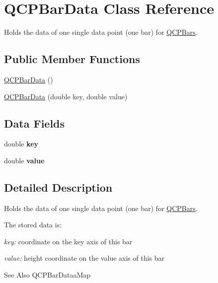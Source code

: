 \hypertarget{classQCPBarData}{\section{Q\-C\-P\-Bar\-Data Class Reference}
\label{classQCPBarData}
}


Holds the data of one single data point (one bar) for \hyperlink{classQCPBars}{Q\-C\-P\-Bars}.  


\subsection*{Public Member Functions}
\begin{DoxyCompactItemize}
\item 
\hyperlink{classQCPBarData_a8d214eda9ef41bc6da2a908a09623836}{Q\-C\-P\-Bar\-Data} ()
\item 
\hyperlink{classQCPBarData_ac0bb7ede5373a7b18713418fa78f972d}{Q\-C\-P\-Bar\-Data} (double key, double value)
\end{DoxyCompactItemize}
\subsection*{Data Fields}
\begin{DoxyCompactItemize}
\item 
\hypertarget{classQCPBarData_afe544b035ef19027ea3d65adeaf81b42}{double {\bfseries key}}\label{classQCPBarData_afe544b035ef19027ea3d65adeaf81b42}

\item 
\hypertarget{classQCPBarData_acab57005d8916d61b64e9ddef6113b60}{double {\bfseries value}}\label{classQCPBarData_acab57005d8916d61b64e9ddef6113b60}

\end{DoxyCompactItemize}


\subsection{Detailed Description}
Holds the data of one single data point (one bar) for \hyperlink{classQCPBars}{Q\-C\-P\-Bars}. 

The stored data is\-: \begin{DoxyItemize}
\item {\itshape key\-:} coordinate on the key axis of this bar \item {\itshape value\-:} height coordinate on the value axis of this bar\end{DoxyItemize}
\begin{DoxySeeAlso}{See Also}
Q\-C\-P\-Bar\-Dataa\-Map 
\end{DoxySeeAlso}


